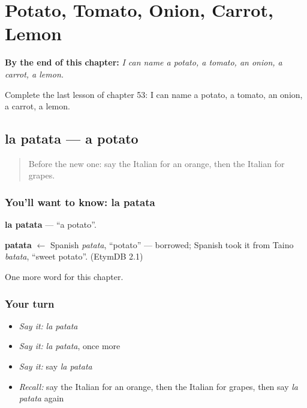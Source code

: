 
\chapter{Potato, Tomato, Onion, Carrot, Lemon}
\label{ch:it-potato-tomato-onion-carrot-lemon}

\begin{chapteropening}
\textbf{By the end of this chapter:} \emph{I can name a potato, a tomato, an onion, a carrot, a lemon.}

Complete the last lesson of chapter 53: I can name a potato, a tomato, an onion, a carrot, a lemon.
\end{chapteropening}

\section[la patata]{la patata — a potato}

\label{lesson:IT-C53-patata}



\begin{quote}
Before the new one: say the Italian for an orange, then the Italian for grapes.
\end{quote}

\subsection*{You'll want to know: la patata}
\textbf{la patata} — \textquotedblleft{}a potato\textquotedblright{}.

\begin{cousinweb}
\textbf{patata} $\leftarrow$ Spanish \emph{patata}, \textquotedblleft{}potato\textquotedblright{} — borrowed; Spanish took it from Taino \emph{batata}, \textquotedblleft{}sweet potato\textquotedblright{}. (EtymDB 2.1)
\end{cousinweb}

\begin{grammarlens}[title={What you've built}]
One more word for this chapter.
\end{grammarlens}

\subsection*{Your turn}
\begin{itemize}
\raggedright
  \item \emph{Say it:} \emph{la patata}
  \item \emph{Say it:} \emph{la patata}, once more
  \item \emph{Say it:} say \emph{la patata}
  \item \emph{Recall:} say the Italian for an orange, then the Italian for grapes, then say \emph{la patata} again
\end{itemize}

